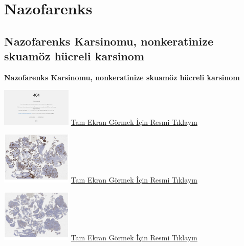 \documentclass[
  letterpaper,
  DIV=11,
  numbers=noendperiod]{scrreprt}
\begin{document}
\hypertarget{sec-nazofarenks}{%
\chapter{Nazofarenks}\label{sec-nazofarenks}}

\hypertarget{sec-nazofarenks-karsinomu-nonkeratinize-skuamoz-hucreli-karsinom}{%
\section{Nazofarenks Karsinomu, nonkeratinize skuamöz hücreli
karsinom}\label{sec-nazofarenks-karsinomu-nonkeratinize-skuamoz-hucreli-karsinom}}

\textbf{Nazofarenks Karsinomu, nonkeratinize skuamöz hücreli karsinom}

\href{https://images.patolojiatlasi.com/nasopharynx-nonkeratinizing-scc/HE.html}{\includegraphics[width=0.25\textwidth,height=\textheight]{./screenshots/nasopharynx-nonkeratinizing-scc-HE_screenshot.png}}
\href{https://images.patolojiatlasi.com/nasopharynx-nonkeratinizing-scc/HE.html}{Tam
Ekran Görmek İçin Resmi Tıklayın}

\href{https://images.patolojiatlasi.com/nasopharynx-nonkeratinizing-scc/panCK.html}{\includegraphics[width=0.25\textwidth,height=\textheight]{./screenshots/nasopharynx-nonkeratinizing-scc-panCK_screenshot.png}}
\href{https://images.patolojiatlasi.com/nasopharynx-nonkeratinizing-scc/panCK.html}{Tam
Ekran Görmek İçin Resmi Tıklayın}

\href{https://images.patolojiatlasi.com/nasopharynx-nonkeratinizing-scc/p63.html}{\includegraphics[width=0.25\textwidth,height=\textheight]{./screenshots/nasopharynx-nonkeratinizing-scc-p63_screenshot.png}}
\href{https://images.patolojiatlasi.com/nasopharynx-nonkeratinizing-scc/p63.html}{Tam
Ekran Görmek İçin Resmi Tıklayın}
\end{document}

